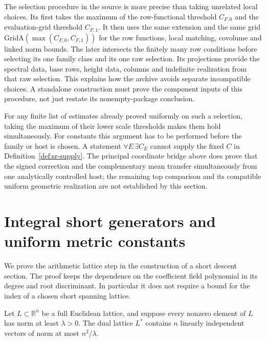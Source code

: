 The selection procedure in the source is more precise than taking
unrelated local choices.  Its
first takes the maximum of the row-functional threshold \(C_{F,0}\)
and the evaluation-grid threshold \(C_{F,1}\).
It then uses the same extension and the same grid
\(\mathrm{GridA}(\max(C_{F,0},C_{F,1}))\)
for the row functions, local matching, covolume and linked norm bounds.
The later 
intersects the finitely many row conditions before selecting its one
family class and its one raw selection.
Its projections provide the spectral data, base rows, height data,
columns and indefinite realization from that raw selection.
This explains how the archive avoids separate incompatible choices.
A standalone construction must prove the component inputs of this
procedure, not just restate its nonempty-package conclusion.

For any finite list of estimates already proved uniformly on such
a selection, taking the maximum of their lower scale thresholds
makes them hold simultaneously.
For constants this argument has to be performed before the family
or host is chosen.  A statement
\(\forall E\,\exists C_E\) cannot supply the fixed \(C\) in
Definition~\ref{def:sr-supply}.
The principal coordinate bridge above does prove that the signed
correction and the complementary mean transfer simultaneously from
one analytically controlled host; the remaining top comparison and
its compatible uniform geometric realization are not established
by this section.

\section{Integral short generators and uniform metric constants}
\label{sec:sr-short-generators}

We prove the arithmetic lattice step in the construction of a short
descent section.  The proof keeps the dependence on the coefficient
field polynomial in its degree and root discriminant.  In particular
it does not require a bound for the index of a chosen short spanning
lattice.

\begin{srlemma}
\label{lem:sr-quadratic-transference}
Let \(L\subset\mathbb R^n\) be a full Euclidean lattice, and suppose
every nonzero element of \(L\) has norm at least \(\lambda>0\).
The dual lattice \(L^*\) contains \(n\) linearly independent vectors
of norm at most \(n^2/\lambda\).
\end{srlemma}

